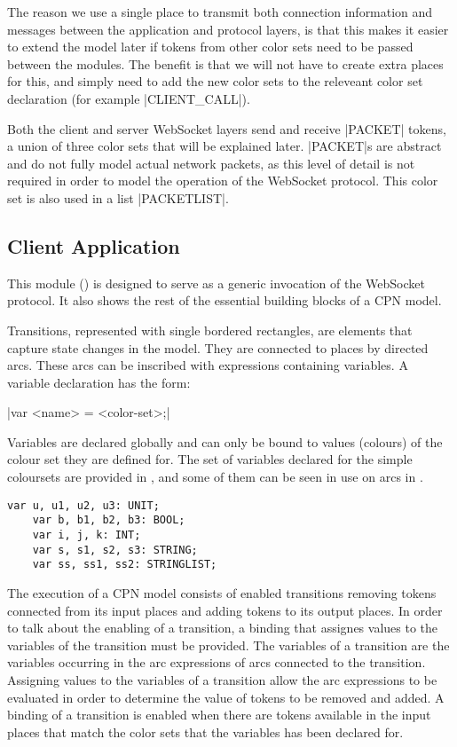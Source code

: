 	
	The reason we use a single place to transmit both connection information and
	messages between the application and protocol layers, is that this makes it
	easier to extend the model later if tokens from other color sets need to be passed
	between the modules. The benefit is that we will not have to create extra places for
	this, and simply need to add the new color sets to the releveant color set
	declaration (for example |CLIENT_CALL|).
	
	Both the client and server WebSocket layers send and receive
	|PACKET| tokens, a union of three color sets that will be explained later.
	|PACKET|s are abstract and do not fully model actual network packets, as this
	level of detail is not required in order to model the operation of the
	WebSocket protocol.
	This color set is also used in a list |PACKETLIST|.
	

\subsection{Client Application}

	
	This module () is designed to serve as a generic invocation
	of the WebSocket protocol. It also shows the rest of the essential building blocks
	of a CPN model.
	
	Transitions, represented with single bordered rectangles, are elements that
	capture state changes in the model. They are connected to places by
	directed arcs. These arcs can be inscribed with expressions containing
	variables. A variable declaration has the form:
	
	|var <name> = <color-set>;|
	
	Variables are declared globally and can only be bound to values (colours) of
	the colour set they are defined for. The set of variables declared for the
	simple coloursets are provided in , and some of them can
	be seen in use on arcs in .
	
	\begin{lstlisting}[label=lst:standard_vars,caption=Simple Colourset
	Variables,gobble=1,float=h] 
	var u, u1, u2, u3: UNIT;
	var b, b1, b2, b3: BOOL;
	var i, j, k: INT;
	var s, s1, s2, s3: STRING;
	var ss, ss1, ss2: STRINGLIST;
	\end{lstlisting}
	
	The execution of a CPN model consists of enabled transitions removing tokens
	connected from its input places and adding tokens to its output places. In
	order to talk about the enabling of a transition, a binding that assignes
	values to the variables of the transition must be provided. The variables of a
	transition are the variables occurring in the arc expressions of arcs
	connected to the transition. Assigning values to the variables of a transition
	allow the arc expressions to be evaluated in order to determine the value of
	tokens to be removed and added. A binding of a transition is enabled when
	there are tokens available in the input places that match the color sets that
	the variables has been declared for. 

